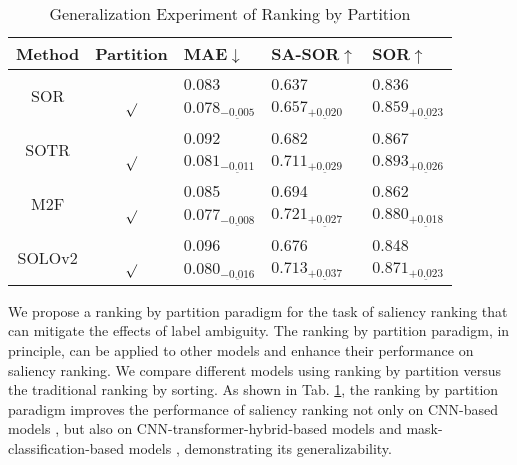 \documentclass[sigconf]{acmart}
\newcommand{\tabref}[1]{Tab. \ref{#1}}
\begin{document}
\begin{table}[t]
    \caption{Generalization Experiment of Ranking by Partition} 
    \label{table:Ablation of partition}
    \setlength{\tabcolsep}{1.5mm}
    \begin{tabular}{c|c|l|l|l}
    \toprule[1pt]
    Method                       & Partition & MAE$\downarrow$ & SA-SOR$\uparrow$ & SOR$\uparrow$    \\
    \hline
    \multirow{2}{*}{SOR \cite{fang2021salient}}         &           & 0.083  & 0.637  & 0.836 \\
                                 & $\surd$   & $0.078_{\underline{-0.005}}$  & $0.657_{\underline{+0.020}}$  & $0.859_{\underline{+0.023}}$  \\
    \multirow{2}{*}{SOTR \cite{guo2021sotr}}        &           & 0.092  & 0.682  & 0.867  \\
                                 & $\surd$   & $0.081_{\underline{-0.011}}$ & $0.711_{\underline{+0.029}}$  & $0.893_{\underline{+0.026}}$   \\
    \multirow{2}{*}{M2F \cite{cheng2022masked}} &           & 0.085  & 0.694  & 0.862  \\
                                 & $\surd$   & $0.077_{\underline{-0.008}}$ & $0.721_{\underline{+0.027}}$ & $0.880_{\underline{+0.018}}$ \\
    \multirow{2}{*}{SOLOv2 \cite{wang2020solov2}}      &           & 0.096  & 0.676  & 0.848  \\
                                 & $\surd$   & $0.080_{\underline{-0.016}}$  & $0.713_{\underline{+0.037}}$  & $0.871_{\underline{+0.023}}$  \\
    \bottomrule[1pt]
    \end{tabular}
\end{table}
We propose a ranking by partition paradigm for the task of saliency ranking that can mitigate the effects of label ambiguity. The ranking by partition paradigm, in principle, can be applied to other models and enhance their performance on saliency ranking. We compare different models using ranking by partition versus the traditional ranking by sorting. As shown in \tabref{table:Ablation of partition}, the ranking by partition paradigm improves the performance of saliency ranking not only on CNN-based models \cite{wang2020solov2}, but also on CNN-transformer-hybrid-based models \cite{guo2021sotr, fang2021salient} and mask-classification-based models \cite{cheng2022masked}, demonstrating its generalizability.
\end{document}

